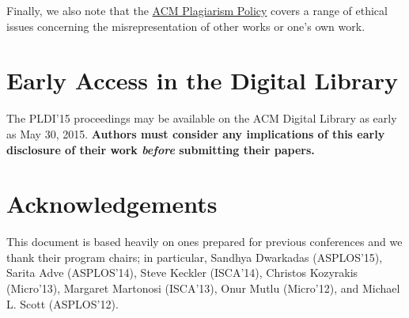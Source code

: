 Finally, we also note that the
\href{http://www.acm.org/publications/policies/plagiarism_policy}{ACM
  Plagiarism Policy} covers a range of ethical issues concerning the
misrepresentation of other works or one's own work.

\section{Early Access in the Digital Library}

The PLDI'15 proceedings may be available on the ACM Digital Library as
early as May 30, 2015. \textbf{Authors must consider any implications
  of this early disclosure of their work \emph{before} submitting
  their papers.}


\section{Acknowledgements}

This document is based heavily on ones prepared for previous
conferences and we thank their program chairs; in particular, Sandhya
Dwarkadas (ASPLOS'15), Sarita Adve (ASPLOS'14), Steve Keckler
(ISCA'14), Christos Kozyrakis (Micro'13), Margaret Martonosi
(ISCA'13), Onur Mutlu (Micro'12), and Michael L. Scott (ASPLOS'12).
